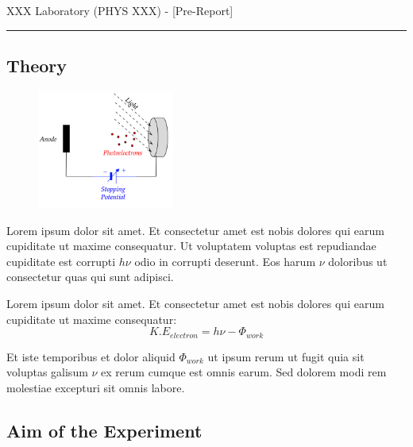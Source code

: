 \documentclass[10pt]{article}
\begin{document}
\thispagestyle{fancy}

\begin{center}
{\LARGE XXX Laboratory (PHYS XXX) -  [Pre-Report]

\vspace{0.4cm}\floweroneright}

\rule{14cm}{0.4pt}
\end{center}


\subsection*{Theory}
\begin{figure} %
    \raggedright
    \vspace{-0.8cm}
    \includegraphics[width=0.4\textwidth]{figures/theory_figure.png}
    \vspace{-0.9cm}
\end{figure}

Lorem ipsum dolor sit amet. Et consectetur amet est nobis dolores qui earum cupiditate ut maxime consequatur. Ut voluptatem voluptas est repudiandae cupiditate est corrupti $h \nu$  odio in corrupti deserunt. Eos harum $\nu$ doloribus ut consectetur quas qui sunt adipisci.
 
Lorem ipsum dolor sit amet. Et consectetur amet est nobis dolores qui earum cupiditate ut maxime consequatur:
 $$ {K.E}_{electron} = h \nu - \Phi_{work} $$

Et iste temporibus et dolor aliquid $\Phi_{work}$ ut ipsum rerum ut fugit quia sit voluptas galisum  $\nu$ ex rerum cumque est omnis earum. Sed dolorem modi rem molestiae excepturi sit omnis labore.

\vspace{0.2cm}

\subsection*{Aim of the Experiment}
\end{document}
